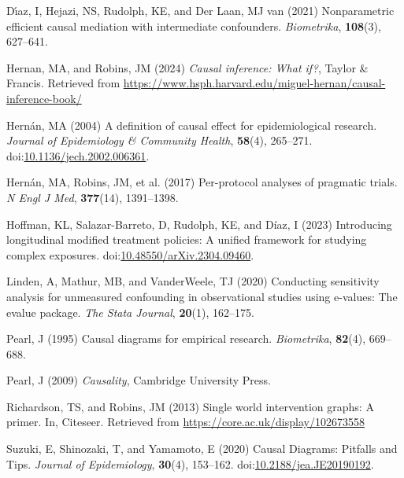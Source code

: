 \documentclass[
  single column]{article}
\newlength{\cslhangindent}
\newenvironment{CSLReferences}[2] %
 {\begin{list}{}{%
  \setlength{\itemindent}{0pt}
  \setlength{\leftmargin}{0pt}
  \setlength{\parsep}{0pt}
  \ifodd #1
   \setlength{\leftmargin}{\cslhangindent}
   \setlength{\itemindent}{-1\cslhangindent}
  \fi
  \setlength{\itemsep}{#2\baselineskip}}}
 {\end{list}}
\begin{document}
\label{refs}
\begin{CSLReferences}{1}{0}
Dı́az, I, Hejazi, NS, Rudolph, KE, and Der Laan, MJ van (2021)
Nonparametric efficient causal mediation with intermediate confounders.
\emph{Biometrika}, \textbf{108}(3), 627--641.

Hernan, MA, and Robins, JM (2024) \emph{Causal inference: What if?},
Taylor \& Francis. Retrieved from
\url{https://www.hsph.harvard.edu/miguel-hernan/causal-inference-book/}

Hernán, MA (2004) A definition of causal effect for epidemiological
research. \emph{Journal of Epidemiology \& Community Health},
\textbf{58}(4), 265--271.
doi:\href{https://doi.org/10.1136/jech.2002.006361}{10.1136/jech.2002.006361}.

Hernán, MA, Robins, JM, et al. (2017) Per-protocol analyses of pragmatic
trials. \emph{N Engl J Med}, \textbf{377}(14), 1391--1398.

Hoffman, KL, Salazar-Barreto, D, Rudolph, KE, and Díaz, I (2023)
Introducing longitudinal modified treatment policies: A unified
framework for studying complex exposures.
doi:\href{https://doi.org/10.48550/arXiv.2304.09460}{10.48550/arXiv.2304.09460}.

Linden, A, Mathur, MB, and VanderWeele, TJ (2020) Conducting sensitivity
analysis for unmeasured confounding in observational studies using
e-values: The evalue package. \emph{The Stata Journal}, \textbf{20}(1),
162--175.

Pearl, J (1995) Causal diagrams for empirical research.
\emph{Biometrika}, \textbf{82}(4), 669--688.

Pearl, J (2009) \emph{Causality}, Cambridge University Press.

Richardson, TS, and Robins, JM (2013) Single world intervention graphs:
A primer. In, Citeseer. Retrieved from
\url{https://core.ac.uk/display/102673558}

Suzuki, E, Shinozaki, T, and Yamamoto, E (2020) Causal Diagrams:
Pitfalls and Tips. \emph{Journal of Epidemiology}, \textbf{30}(4),
153--162.
doi:\href{https://doi.org/10.2188/jea.JE20190192}{10.2188/jea.JE20190192}.


\end{CSLReferences}
\end{document}
